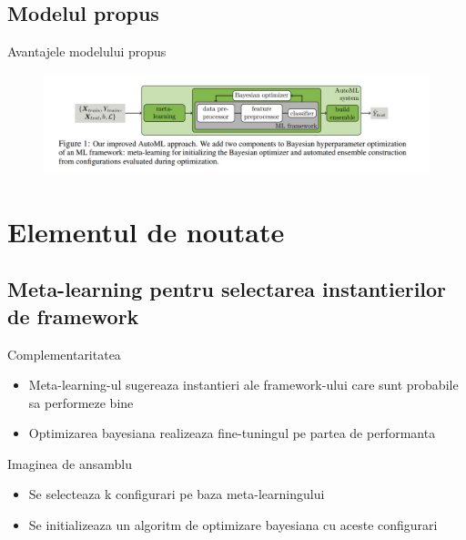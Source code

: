 \documentclass{beamer}
\begin{document}
\subsection{Modelul propus}
\begin{frame}{Avantajele modelului propus}
	\begin{figure}[H]
		\centering
		\includegraphics[scale=0.5]{conf.PNG}
	\end{figure}
\end{frame}

\section{Elementul de noutate}
\subsection{Meta-learning pentru selectarea instantierilor de framework}

	\begin{frame}{Complementaritatea}
		\begin{itemize}
			\item Meta-learning-ul sugereaza instantieri ale framework-ului care sunt probabile sa performeze bine
			\item Optimizarea bayesiana realizeaza fine-tuningul pe partea de performanta 
		\end{itemize}	
	\end{frame}

	\begin{frame}{Imaginea de ansamblu}
		\begin{itemize}
			\item Se selecteaza k configurari pe baza meta-learningului
			\item Se initializeaza un algoritm de optimizare bayesiana cu aceste configurari
		\end{itemize}	
	\end{frame}
\end{document}
